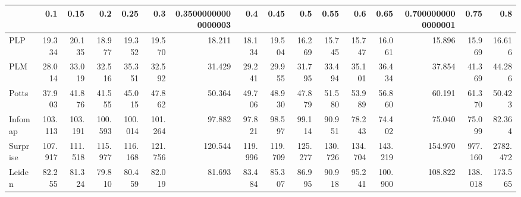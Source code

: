 \begin{tabular}{lrrrrrrrrrrrrrrr}
\toprule
{} &     0.1 &    0.15 &     0.2 &    0.25 &     0.3 & 0.35000000000000003 &     0.4 &    0.45 &     0.5 &    0.55 &     0.6 &    0.65 & 0.7000000000000001 &    0.75 &      0.8 \\
\midrule
PLP      &  19.334 &  20.135 &  18.977 &  19.352 &  19.570 &              18.211 &  18.134 &  19.504 &  16.269 &  15.745 &  15.747 &  16.061 &             15.896 &  15.969 &   16.616 \\
PLM      &  28.014 &  33.019 &  32.516 &  35.351 &  32.592 &              31.429 &  29.241 &  29.955 &  31.795 &  33.494 &  35.101 &  36.434 &             37.854 &  41.369 &   44.286 \\
Potts    &  37.903 &  41.876 &  41.555 &  45.015 &  47.862 &              50.364 &  49.706 &  48.930 &  47.879 &  51.580 &  53.989 &  56.860 &             60.191 &  61.370 &   50.423 \\
Infomap  & 103.113 & 103.191 & 100.593 & 100.014 & 101.264 &              97.882 &  97.821 &  98.597 &  99.114 &  90.951 &  78.243 &  74.402 &             75.040 &  75.099 &   82.364 \\
Surprise & 107.917 & 111.518 & 115.977 & 116.168 & 121.756 &             120.544 & 119.996 & 119.709 & 125.277 & 130.726 & 134.704 & 143.219 &            154.970 & 977.160 & 2782.472 \\
Leiden   &  82.255 &  81.324 &  79.810 &  80.459 &  82.019 &              81.693 &  83.484 &  85.307 &  86.995 &  90.918 &  95.241 & 100.900 &            108.822 & 138.018 &  173.565 \\
\bottomrule
\end{tabular}
